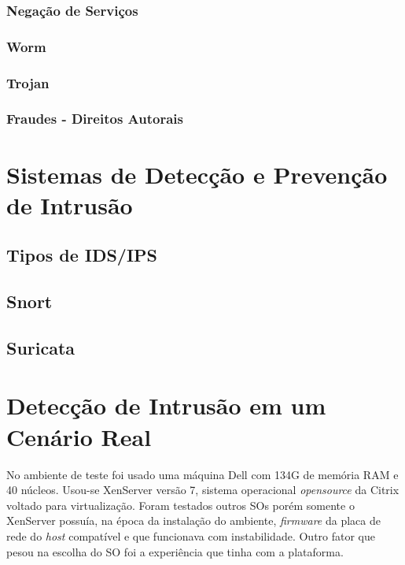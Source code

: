 \documentclass[
	12pt,				%
	openright,			%
	twoside,			%
	a4paper,			%
	english,			%
	brazil				%
	]{abntex2}
\begin{document}
\subsection{Negação de Serviços}
\subsection{Worm}
\subsection{Trojan}
\subsection{Fraudes - Direitos Autorais}
\chapter{Sistemas de Detecção e Prevenção de Intrusão}
\section{Tipos de IDS/IPS}
\section{Snort}
\section{Suricata}
\chapter{Detecção de Intrusão em um Cenário Real}

No ambiente de teste foi usado uma máquina Dell com 134G de memória RAM e 40 núcleos. Usou-se XenServer \cite{xenserver} versão 7, sistema operacional \textit{opensource} da Citrix voltado para virtualização. Foram testados outros SOs porém somente o XenServer possuía, na época da instalação do ambiente, \textit{firmware} da placa de rede do \textit{host} compatível e que funcionava com instabilidade. Outro fator que pesou na escolha do SO foi a experiência que tinha com a plataforma.
\end{document}
